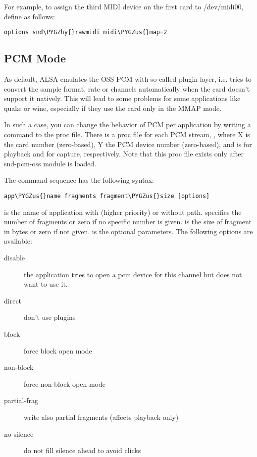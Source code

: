 \documentclass[a4paper,8pt,english]{sphinxmanual}
\def\PYGZus{\char`\_}
\def\PYGZhy{\char`\-}
\begin{document}
For example, to assign the third MIDI device on the first card to
/dev/midi00, define as follows:

\begin{Verbatim}[commandchars=\\\{\}]
options snd\PYGZhy{}rawmidi midi\PYGZus{}map=2
\end{Verbatim}


\subsection{PCM Mode}
\label{sound/designs/oss-emulation:pcm-mode}
As default, ALSA emulates the OSS PCM with so-called plugin layer,
i.e. tries to convert the sample format, rate or channels
automatically when the card doesn't support it natively.
This will lead to some problems for some applications like quake or
wine, especially if they use the card only in the MMAP mode.

In such a case, you can change the behavior of PCM per application by
writing a command to the proc file.  There is a proc file for each PCM
stream, , where X is the card number
(zero-based), Y the PCM device number (zero-based), and  is for
playback and  for capture, respectively.  Note that this proc file
exists only after snd-pcm-oss module is loaded.

The command sequence has the following syntax:

\begin{Verbatim}[commandchars=\\\{\}]
app\PYGZus{}name fragments fragment\PYGZus{}size [options]
\end{Verbatim}

 is the name of application with (higher priority) or without
path.
 specifies the number of fragments or zero if no specific
number is given.
 is the size of fragment in bytes or zero if not given.
 is the optional parameters.  The following options are
available:
\begin{description}
\item[{disable}] \leavevmode
the application tries to open a pcm device for
this channel but does not want to use it.

\item[{direct}] \leavevmode
don't use plugins

\item[{block}] \leavevmode
force block open mode

\item[{non-block}] \leavevmode
force non-block open mode

\item[{partial-frag}] \leavevmode
write also partial fragments (affects playback only)

\item[{no-silence}] \leavevmode
do not fill silence ahead to avoid clicks

\end{description}
\end{document}
